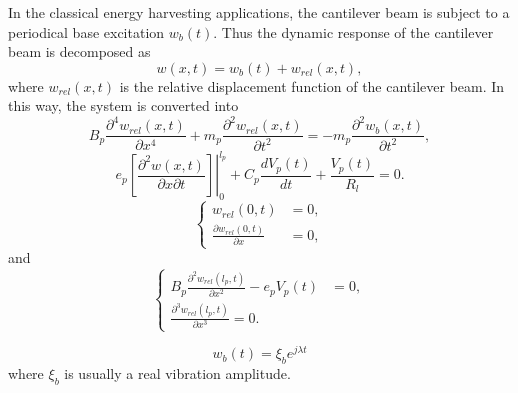 \documentclass{article}
\begin{document}
In the classical energy harvesting applications, the cantilever beam is subject to a periodical base excitation $w_b(t)$. Thus the dynamic response of the cantilever beam is decomposed as 
\begin{equation}
    w(x,t) = w_b(t) + w_{rel}(x,t),
\end{equation}
where $w_{rel}(x,t)$ is the relative displacement function of the cantilever beam. In this way, the system is converted into 
\begin{equation}
    B_p \frac{\partial^4 w_{rel}(x,t)}{\partial x^4} + m_p \frac{\partial^2 w_{rel}(x,t)}{\partial t^2} = - m_p \frac{\partial^2 w_{b}(x,t)}{\partial t^2},
\end{equation}
\begin{equation}
    e_p \left.\left[ \frac{\partial^2 w(x,t)}{\partial x \partial t}\right]\right|_0^{l_p} + C_p \frac{d V_p(t)}{d t} + \frac{V_p(t)}{R_l} = 0.
\end{equation}
\begin{equation}
    \left\{\begin{aligned}
        w_{rel}(0,t) &= 0, \\
        \frac{\partial w_{rel}(0,t)}{\partial x} &= 0,
    \end{aligned}\right.
\end{equation}
and
\begin{equation}
    \left\{\begin{aligned}
        B_p \frac{\partial^2 w_{rel}(l_p,t)}{\partial x^2} - e_p V_p(t) &= 0, \\
        \frac{\partial^3 w_{rel}(l_p,t)}{\partial x^3} = 0.
    \end{aligned}\right.
\end{equation}



\begin{equation}
    w_b(t) = \xi_b e^{j \lambda t}
\end{equation}
where $\xi_b$ is usually a real vibration amplitude.
\end{document}
